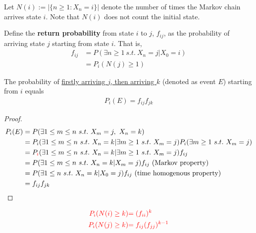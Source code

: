 \documentclass{article}
\begin{document}
    \begin{notation}
    	Let $N(i) := |\{n \geq 1: X_n = i\}|$ denote the number of times the Markov chain arrives state $i$. Note that $N(i)$ does not count the initial state.
    \end{notation}
    
    \begin{definition}
    	Define the \textbf{return probability} from state $i$ to $j$, $f_{ij}$, as the probability of arriving state $j$ starting from state $i$. That is,
    	\begin{align}
    		f_{ij} &= P(\exists n \geq 1\ s.t.\ X_n = j | X_0 = i) \\
    		&= P_i(N(j) \geq 1)
    	\end{align}
    \end{definition}
    
    \begin{proposition}
    	The probability of \ul{firstly arriving $j$, then arriving $k$} (denoted as event $E$) starting from $i$ equals
    	\begin{align}
    		P_i(E) = f_{ij} f_{jk}
    	\end{align}
    \end{proposition}
    
    \begin{proof}
    	\begin{align}
    		P_i(E) &= P(\exists 1 \leq m \leq n \ s.t.\ X_m=j,\ X_n = k) \\
    		&= P_i(\exists 1 \leq m \leq n \ s.t.\ X_n = k|\exists m \geq 1\ s.t.\ X_m=j) P_i(\exists m \geq 1\ s.t.\ X_m=j) \\
    		&= P_{\textcolor{red}{i}}(\exists 1 \leq m \leq n \ s.t.\ X_n = k|\exists m \geq 1\ s.t.\ X_m=j) f_{ij} \\
    		&= P(\exists 1 \leq m \leq n \ s.t.\ X_n = k|X_m=j) f_{ij} \text{{ (Markov property)}} \\
    		&= P(\exists 1 \leq n \ s.t.\ X_n = k|X_0=j) f_{ij} \text{{ (time homogenous property)}} \\
    		&= f_{ij}f_{jk}
    	\end{align}
    \end{proof}
    
    \begin{corollary}
    	\begin{align}
    		\textcolor{red}{P_i(N(i) \geq k)} &\textcolor{red}{= (f_{ii})^k} \\
    		\textcolor{red}{P_i(N(j) \geq k)} &\textcolor{red}{= f_{ij}(f_{jj})^{k-1}}
    	\end{align}
    \end{corollary}
\end{document}
